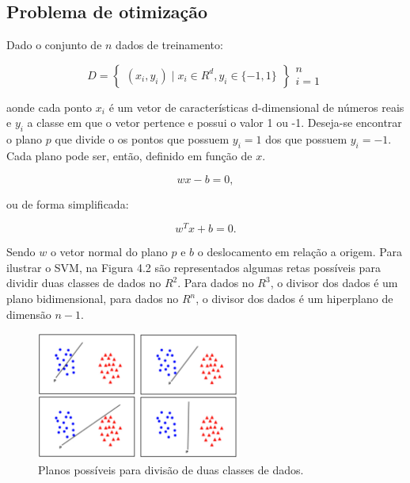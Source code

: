 \subsection{Problema de otimização}

Dado o conjunto de $n$ dados de treinamento:

\begin{equation*}
D = \begin{Bmatrix}
({x}_{i}, {y}_{i}) \mid {x}_{i} \in {R}^{d}, {y}_{i} \in \{-1,1\} 
\end{Bmatrix}
\begin{matrix}
n \\ 
i = 1
\end{matrix}
\end{equation*}

aonde cada ponto ${x}_{i}$ é um vetor de características d-dimensional de números reais e ${y}_{i}$ a classe em que o vetor pertence e possui o valor 1 ou -1. Deseja-se encontrar o plano $p$ que divide o os pontos que possuem ${y}_{i} = 1$ dos que possuem ${y}_{i} = -1$. Cada plano pode ser, então, definido em função de $x$.

\begin{equation*}
wx - b = 0,
\end{equation*}

ou de forma simplificada:

\begin{equation*}
{w}^{T}x + b = 0.
\end{equation*}

Sendo ${w}$ o vetor normal do plano $p$ e $b$ o deslocamento em relação a origem. Para ilustrar o SVM, na Figura 4.2 são representados algumas retas possíveis para dividir duas classes de dados no ${R}^{2}$. Para dados no ${R}^{3}$, o divisor dos dados é um plano bidimensional, para dados no ${R}^{n}$, o divisor dos dados é um hiperplano de dimensão $n-1$.

\begin{figure}[htpb]
	\begin{center}
		\includegraphics[width=0.6\textwidth]{figuras/svm-plans.pdf}
		\caption{Planos possíveis para divisão de duas classes de dados.}
	\end{center}
\end{figure}

